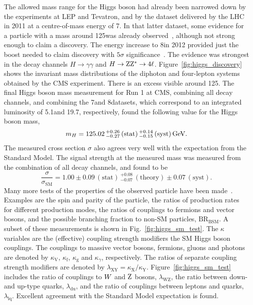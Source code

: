 The allowed mass range for the Higgs boson had already been narrowed down by the experiments at LEP
and Tevatron, and by the dataset delivered by the LHC in 2011 at a centre-of-mass energy of 7\TeV. 
In that latter dataset, some evidence for a particle with a mass around 125\GeV was already
observed~\cite{Chatrchyan:2012tx}, although not strong enough to claim a discovery. 
The energy increase to 8\TeV in 2012 provided just the boost needed to claim
discovery with $5\sigma$ significance~\cite{Chatrchyan:2012ufa}. The evidence was strongest in the
decay channels $H\rightarrow\gamma\gamma$ and $H\rightarrow\mathrm{Z}\mathrm{Z}^*\rightarrow 4\ell$.
Figure~\ref{fig:higgs_discovery} shows the invariant mass distributions of the diphoton and
four-lepton systems obtained by the CMS experiment. There is an excess visible around 125\GeV. 
The final Higgs boson mass measurement for Run 1 at CMS, combining all decay channels, and combining
the 7\TeV and 8\TeV datasets, which correspond to an integrated luminosity of 5.1\fbinv and
19.7\fbinv, respectively, 
found the following value for the Higgs boson mass,
\begin{equation}
  m_H = 125.02 {\,}^{+0.26}_{-0.27} \, (\text{stat}) {\,}^{+0.14}_{-0.15} \, (\text{syst}) \,\text{Ge\hspace{-.08em}V}.
\end{equation}
The measured cross section $\sigma$ also agrees very well with the expectation from the Standard
Model. The signal strength at the measured mass was measured from the combination of all decay
channels, and found to be
\begin{equation}
 \frac{\sigma}{\sigma_{\text{SM}}} = 1.00 \pm 0.09 \, (\text{stat})
{\,}^{+0.08}_{-0.07} \, (\text{theory}) \pm 0.07 \, (\text{syst}) .
\end{equation}
Many more tests of the properties of the observed particle have been
made~\cite{Khachatryan:2014jba}. Examples are the spin and parity of the particle, the ratios of
production rates for different production modes, the ratios of couplings to fermions and vector
bosons, and the possible branching fraction to non-SM particles, $\text{BR}_{\text{BSM}}$. 
A subset of these measurements is shown in Fig.~\ref{fig:higgs_sm_test}. The $\kappa$ variables
are the (effective) coupling strength modifiers \wrt the SM Higgs boson couplings. The couplings to
massive vector bosons, fermions, gluons and photons are denoted by $\kappa_{\text{V}}$,
$\kappa_{\text{f}}$, $\kappa_{\text{g}}$ and $\kappa_\gamma$, respectively.
The ratios of separate coupling strength modifiers are denoted by $\lambda_{\text{XY}} =
\kappa_{\text{X}}/\kappa_{\text{Y}}$. Figure~\ref{fig:higgs_sm_test} includes the ratio of
couplings to $W$ and $\mathrm{Z}$ bosons, $\lambda_{\text{WZ}}$, the ratio between down- and up-type
quarks, $\lambda_{\text{du}}$, and the ratio of couplings between leptons and quarks,
$\lambda_{\text{lq}}$. 
Excellent agreement with the Standard Model expectation is found.

